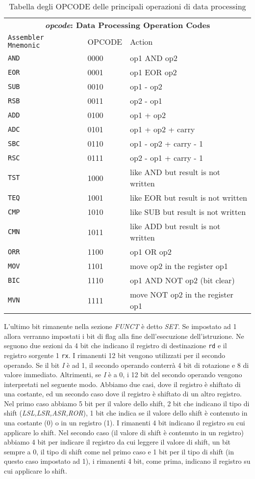 \begin{defn}
    \def\opcode#1#2#3{\texttt{#1} & \small #2 & #3\\}
    \begin{table}[H]
	\centering
	\caption{Tabella degli OPCODE delle principali operazioni di data processing}
	\label{tab:opcodes}
	\begin{tabular}{l@{\hspace{5mm}}ll}
	\multicolumn{3}{c}{\bfseries \emph{opcode}: Data Processing Operation Codes } \\
	\opcode{Assembler Mnemonic}{OPCODE}{Action}
	\hline
    \opcode{AND}{0000}{op1 AND op2}
    \opcode{EOR}{0001}{op1 EOR op2}
    \opcode{SUB}{0010}{op1 - op2}
    \opcode{RSB}{0011}{op2 - op1}
    \opcode{ADD}{0100}{op1 + op2}
    \opcode{ADC}{0101}{op1 + op2 + carry}
    \opcode{SBC}{0110}{op1 - op2 + carry - 1}
    \opcode{RSC}{0111}{op2 - op1 + carry - 1}
    \opcode{TST}{1000}{like AND but result is not written}
    \opcode{TEQ}{1001}{like EOR but result is not written}
    \opcode{CMP}{1010}{like SUB but result is not written}
    \opcode{CMN}{1011}{like ADD but result is not written}
    \opcode{ORR}{1100}{op1 OR op2}
    \opcode{MOV}{1101}{move op2 in the register op1}
    \opcode{BIC}{1110}{op1 AND NOT op2 (bit clear)}
    \opcode{MVN}{1111}{move NOT op2 in the register op1}
    \hline
    \end{tabular}
    \end{table}
    L'ultimo bit rimanente nella sezione \textit{FUNCT} è detto \textit{SET}. Se impostato ad 1 allora verranno impostati i bit di flag alla fine dell'esecuzione dell'istruzione.
    Ne seguono due sezioni da 4 bit che indicano il registro di destinazione \texttt{rd} e
    il registro sorgente 1 \texttt{rx}.
    I rimanenti 12 bit vengono utilizzati per il secondo operando.
    Se il bit \textit{I} è ad 1, il secondo operando conterrà 4 bit di rotazione e 8 di valore immediato.
    Altrimenti, se \textit{I} è a 0, i 12 bit del secondo operando vengono interpretati nel seguente modo.
    Abbiamo due casi, dove il registro è shiftato di una costante, ed un secondo caso dove il registro è shiftato di
    un altro registro. Nel primo caso abbiamo 5 bit per il valore dello shift, 2 bit che indicano il tipo di shift (\textit{LSL,LSR,ASR,ROR}), 1 bit che indica se
    il valore dello shift è contenuto in una costante (0) o in un registro (1). I rimanenti 4 bit indicano il registro su cui applicare lo shift.
    Nel secondo caso (il valore di shift è contenuto in un registro) abbiamo 4 bit per indicare il registro da cui leggere il valore di shift, un bit sempre a 0,
    il tipo di shift come nel primo caso e 1 bit per il tipo di shift (in questo caso impostato ad 1), i rimanenti 4 bit, come prima, indicano il registro su cui applicare lo shift.
\end{defn}

